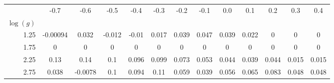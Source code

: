 \begin{tabular}{r|cccccccccccc}
\hline\hline
[Mg/H] & -0.7 & -0.6 & -0.5 & -0.4 & -0.3 & -0.2 & -0.1 & 0.0 & 0.1 & 0.2 & 0.3 & 0.4 \\
$\log(g)$ &  &  &  &  &  &  &  &  &  &  &  &  \\
\hline
1.25 & -0.00094 & 0.032 & -0.012 & -0.01 & 0.017 & 0.039 & 0.047 & 0.039 & 0.022 & 0 & 0 & 0 \\
1.75 & 0 & 0 & 0 & 0 & 0 & 0 & 0 & 0 & 0 & 0 & 0 & 0 \\
2.25 & 0.13 & 0.14 & 0.1 & 0.096 & 0.099 & 0.073 & 0.053 & 0.044 & 0.039 & 0.044 & 0.015 & 0.015 \\
2.75 & 0.038 & -0.0078 & 0.1 & 0.094 & 0.11 & 0.059 & 0.039 & 0.056 & 0.065 & 0.083 & 0.048 & 0.048 \\
\hline
\end{tabular}
